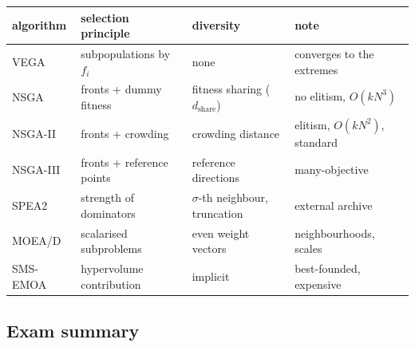 \documentclass[11pt,a4paper]{article}
\theoremstyle{definition}
\begin{document}
\begin{center}
\small
\begin{tabular}{@{}llll@{}}
\toprule
\textbf{algorithm} & \textbf{selection principle} & \textbf{diversity} & \textbf{note} \\
\midrule
VEGA & subpopulations by $f_i$ & none & converges to the extremes \\
NSGA & fronts + dummy fitness & fitness sharing ($d_{\mathrm{share}}$) & no elitism, $O(kN^3)$ \\
NSGA-II & fronts + crowding & crowding distance & elitism, $O(kN^2)$, standard \\
NSGA-III & fronts + reference points & reference directions & many-objective \\
SPEA2 & strength of dominators & $\sigma$-th neighbour, truncation & external archive \\
MOEA/D & scalarised subproblems & even weight vectors & neighbourhoods, scales \\
SMS-EMOA & hypervolume contribution & implicit & best-founded, expensive \\
\bottomrule
\end{tabular}
\end{center}

\subsection{Exam summary}
\end{document}
